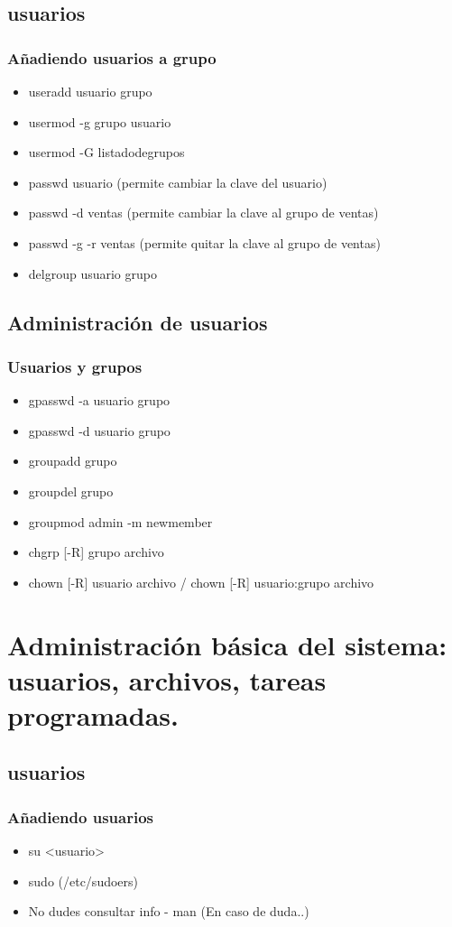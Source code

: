 \documentclass{beamer}
\begin{document}
\subsection{usuarios}
\begin{frame}
\frametitle{A\~nadiendo usuarios a grupo}
\begin{itemize}
\item useradd usuario grupo 
\item usermod -g grupo usuario
\item usermod  -G listadodegrupos
\item passwd usuario (permite cambiar la clave del usuario)
\item passwd -d ventas (permite cambiar la clave al grupo de ventas)
\item passwd -g -r ventas (permite quitar la clave al grupo de ventas)
\item delgroup usuario grupo
\end{itemize}
\end{frame}

\subsection{Administraci\'on de usuarios}
\begin{frame}
\frametitle{Usuarios y grupos}
        \begin{itemize}
        \item gpasswd -a usuario grupo
        \item gpasswd -d usuario grupo
        \item groupadd grupo
        \item groupdel grupo
        \item groupmod admin -m newmember
        \item chgrp [-R] grupo archivo
        \item chown [-R] usuario archivo / chown [-R] usuario:grupo archivo
        \end{itemize}
\end{frame} 

\section{Administraci\'on b\'asica del sistema: usuarios, archivos, tareas programadas. }
\subsection{usuarios}
\begin{frame}
\frametitle{A\~nadiendo usuarios}
\begin{itemize}
\item su <usuario>
\item sudo (/etc/sudoers)
\item No dudes consultar info - man (En caso de duda..)
\end{itemize}
\end{frame}
\end{document}
